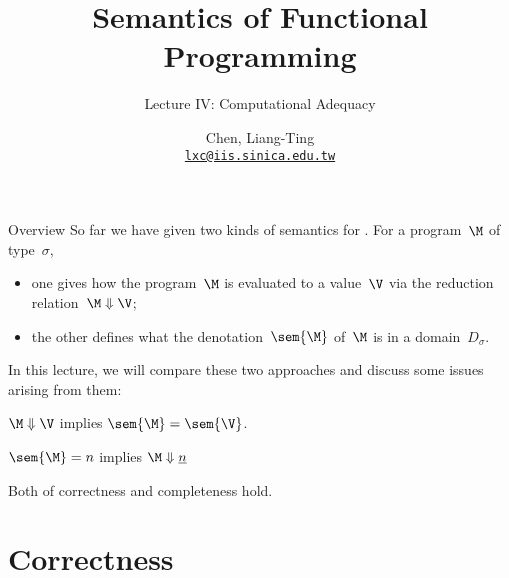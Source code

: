 \title{Semantics of Functional Programming}
\subtitle{Lecture IV: Computational Adequacy}
\author[L.-T. Chen]{Chen, Liang-Ting\\
  \href{mailto:lxc@iis.sinica.edu.tw}{\texttt{lxc@iis.sinica.edu.tw}}}

\frame{\maketitle}

\begin{frame}{Overview}
  So far we have given two kinds of semantics for \PCF{}. For a program~$\M$ of
  type~$\sigma$,
  \begin{itemize}
    \item one gives how the program~$\M$ is evaluated to a value~$\V$
      via the reduction relation~$\M \Downarrow\V$;
    \item the other defines what the denotation~$\sem{\M}$ of~$\M$ is in a
      domain~$D_\sigma$. 
    \end{itemize}
  In this lecture, we will compare these two approaches and discuss some issues
  arising from them:
  \begin{description}
    \item[Correctness] $\M \Downarrow \V$ implies $\sem{\M} = \sem{\V}$.
    \item[Completeness] $\sem{\M} = n$ implies $\M \Downarrow \underline{n}$
    \item[Computational adequacy]
      Both of correctness and completeness hold. 
  \end{description}

\end{frame}

\section{Correctness}

